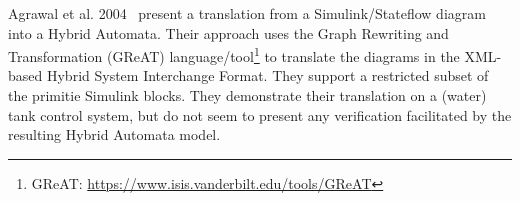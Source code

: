 Agrawal et al. 2004~\cite{agrawal_semantic_2004} present a translation from a Simulink/Stateflow diagram into a Hybrid Automata. Their approach uses the Graph Rewriting and Transformation (GReAT) language/tool\footnote{GReAT: \url{https://www.isis.vanderbilt.edu/tools/GReAT}} to translate the diagrams in the XML-based Hybrid System Interchange Format. They support a restricted subset of the primitie Simulink blocks. They demonstrate their translation on a (water) tank control system, but do not seem to present any verification facilitated by the resulting Hybrid Automata model.
